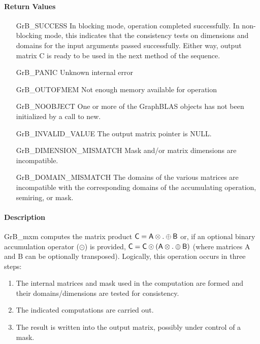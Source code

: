 \paragraph{Return Values}

\begin{itemize}[leftmargin=2.1in]
	\item[{\sf GrB\_SUCCESS}]	      In blocking mode, operation
	completed successfully. In non-blocking mode, this indicates
	that the consistency tests on dimensions and domains for the
	input arguments passed successfully. Either way, output matrix
	{\sf C} is ready to be used in the next method of the sequence.

	\item[{\sf GrB\_PANIC}]		      Unknown internal error

	\item[{\sf GrB\_OUTOFMEM}]	      Not enough memory available
	for operation
    
    \item[{\sf GrB\_NOOBJECT}]        One or more of the GraphBLAS objects has 
    not been initialized by a call to {\sf new}.
    
    \item[{\sf GrB\_INVALID\_VALUE}]  The output matrix pointer is {\sf NULL}.

	\item[{\sf GrB\_DIMENSION\_MISMATCH}] Mask and/or matrix dimensions are
	incompatible.

	\item[{\sf GrB\_DOMAIN\_MISMATCH}]    The domains of the various
	matrices are incompatible with the corresponding domains of the
	accumulating operation, semiring, or mask.
\end{itemize}

\paragraph{Description}

{\sf GrB\_mxm} computes the matrix product ${\sf C} = {\sf
A} \otimes . \oplus {\sf B}$ or, if an optional binary accumulation
operator ($\odot$) is provided, ${\sf C} = {\sf C} \odot
\left({\sf A} \otimes . \oplus {\sf B}\right)$ (where matrices {\sf A}
and {\sf B} can be optionally transposed).  Logically, this operation
occurs in three steps:
\begin{enumerate}
\item The internal matrices and mask used in the computation are formed and their domains/dimensions are tested for consistency.
\item The indicated computations are carried out.
\item The result is written into the output matrix, possibly under control of a mask.
\end{enumerate}

